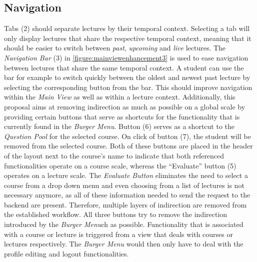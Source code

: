 \subsection{Navigation}
\label{section:con:proposals:mainview:navigation}
Tabs (2) should separate lectures by their temporal context. Selecting a tab will only display lectures that share the respective temporal context, meaning that it should be easier to switch between \emph{past}, \emph{upcoming} and \emph{live} lectures.
The \emph{Navigation Bar} (3) in \autoref{figure:mainviewenhancement3} is used to ease navigation between lectures that share the same temporal context. A student can use the bar for example to switch quickly between the oldest and newest past lecture by selecting the corresponding button from the bar. This should improve navigation within the \emph{Main View} as well as within a lecture context. 
Additionally, this proposal aims at removing indirection as much as possible on a global scale by providing certain buttons that serve as shortcuts for the functionality that is currently found in the \emph{Burger Menu}. Button (6) serves as a shortcut to the \emph{Question Pool} for the selected course. On click of button (7), the student will be removed from the selected course. Both of these buttons are placed in the header of the layout next to the course’s name to indicate that both referenced functionalities operate on a course scale, whereas the “Evaluate” button (5) operates on a lecture scale. The \emph{Evaluate Button} eliminates the need to select a course from a drop down menu and even choosing from a list of lectures is not necessary anymore, as all of these information needed to send the request to the backend are present. Therefore, multiple layers of indirection are removed from the established workflow. All three buttons try to remove the indirection introduced by the \emph{Burger Menu}ch as possible. Functionality that is associated with a course or lecture is triggered from a view that deals with courses or lectures respectively. The \emph{Burger Menu} would then only have to deal with the profile editing and logout functionalities.

